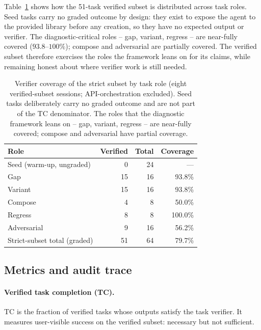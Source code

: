 \documentclass[sigconf,anonymous,review,natbib=false]{acmart}
\begin{document}
Table~\ref{tab:role-coverage} shows how the 51-task verified subset is distributed across task roles. Seed tasks carry no graded outcome by design: they exist to expose the agent to the provided library before any creation, so they have no expected output or verifier. The diagnostic-critical roles -- gap, variant, regress -- are near-fully covered ($93.8$--$100\%$); compose and adversarial are partially covered. The verified subset therefore exercises the roles the framework leans on for its claims, while remaining honest about where verifier work is still needed.

\begin{table}[t]
\centering
\small
\caption{Verifier coverage of the strict subset by task role (eight verified-subset sessions; API-orchestration excluded). Seed tasks deliberately carry no graded outcome and are not part of the TC denominator. The roles that the diagnostic framework leans on -- gap, variant, regress -- are near-fully covered; compose and adversarial have partial coverage.}
\label{tab:role-coverage}
\begin{tabular}{lrrr}
\toprule
\textbf{Role} & \textbf{Verified} & \textbf{Total} & \textbf{Coverage} \\
\midrule
Seed (warm-up, ungraded) & 0  & 24 & --- \\
Gap                      & 15 & 16 & 93.8\% \\
Variant                  & 15 & 16 & 93.8\% \\
Compose                  & 4  & 8  & 50.0\% \\
Regress                  & 8  & 8  & 100.0\% \\
Adversarial              & 9  & 16 & 56.2\% \\
\midrule
Strict-subset total (graded) & 51 & 64 & 79.7\% \\
\bottomrule
\end{tabular}
\end{table}

\subsection{Metrics and audit trace}

\paragraph{Verified task completion (TC).}
TC is the fraction of verified tasks whose outputs satisfy the task verifier. It measures user-visible success on the verified subset: necessary but not sufficient.
\end{document}
